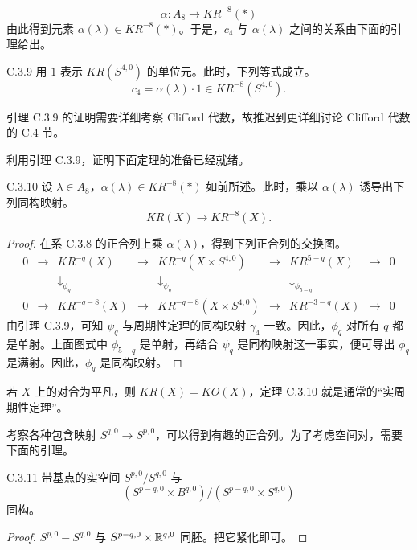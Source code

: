 \[
  \alpha\colon A_8\to KR^{-8}(*)
\]
由此得到元素 $\alpha(\lambda)\in KR^{-8}(*)$。于是，$c_4$ 与 $\alpha(\lambda)$ 之间的关系由下面的引理给出。

\begin{lemma*}{C.3.9}
  用 $1$ 表示 $KR(S^{4,0})$ 的单位元。此时，下列等式成立。
  \[
    c_4=\alpha(\lambda)\cdot 1\in KR^{-8}(S^{4,0}).
  \]
\end{lemma*}

引理 C.3.9 的证明需要详细考察 Clifford 代数，故推迟到更详细讨论 Clifford 代数的 C.4 节。

利用引理 C.3.9，证明下面定理的准备已经就绪。

\begin{theorem*}{C.3.10}
  设 $\lambda\in A_8$，$\alpha(\lambda)\in KR^{-8}(*)$ 如前所述。此时，乘以 $\alpha(\lambda)$ 诱导出下列同构映射。
  \[
    KR(X)\to KR^{-8}(X).
  \]
\end{theorem*}

\begin{proof}
  在系 C.3.8 的正合列上乘 $\alpha(\lambda)$，得到下列正合列的交换图。
  \[
  \begin{array}{ccccccccc}
    0 & \to & KR^{-q}(X) & \to & KR^{-q}(X\times S^{4,0}) & \to & KR^{5-q}(X) & \to & 0\\[1mm]
      &     & \downarrow_{\phi_q} & & \downarrow_{\psi_q} & & \downarrow_{\phi_{5-q}} & & \\[1mm]
    0 & \to & KR^{-q-8}(X) & \to & KR^{-q-8}(X\times S^{4,0}) & \to & KR^{-3-q}(X) & \to & 0
  \end{array}
  \]
  由引理 C.3.9，可知 $\psi_q$ 与周期性定理的同构映射 $\gamma_4$ 一致。因此，$\phi_q$ 对所有 $q$ 都是单射。上面图式中 $\phi_{5-q}$ 是单射，再结合 $\psi_q$ 是同构映射这一事实，便可导出 $\phi_q$ 是满射。因此，$\phi_q$ 是同构映射。
\end{proof}

若 $X$ 上的对合为平凡，则 $KR(X)=KO(X)$，定理 C.3.10 就是通常的“实周期性定理”。

考察各种包含映射 $S^{q,0}\to S^{p,0}$，可以得到有趣的正合列。为了考虑空间对，需要下面的引理。

\begin{lemma*}{C.3.11}
  带基点的实空间 $S^{p,0}/S^{q,0}$ 与
  \[
    (S^{p-q,0}\times B^{q,0})/(S^{p-q,0}\times S^{q,0})
  \]
  同构。
\end{lemma*}

\begin{proof}
  $S^{p,0}-S^{q,0}$ 与 $S^{p-q,0}\times\mathbb{R}^{q,0}$ 同胚。把它紧化即可。
\end{proof}

